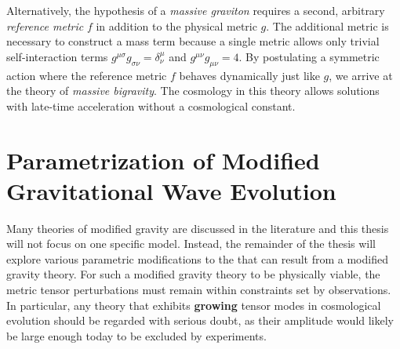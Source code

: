 \documentclass[12pt,parskip=half]{scrreprt}
\begin{document}
Alternatively, the hypothesis of a \emph{massive graviton} requires a second, arbitrary \emph{reference metric} \(f\) in addition to the physical metric \(g\). The additional metric is necessary to construct a mass term because a single metric allows only trivial self-interaction terms \(g^{\mu\sigma}g_{\sigma\nu}=\delta^\mu_\nu\) and \(g^{\mu\nu}g_{\mu\nu} = 4\). By postulating a symmetric action where the reference metric \(f\) behaves dynamically just like \(g\), we arrive at the theory of \emph{massive bigravity}.
The cosmology in this theory allows solutions with late-time acceleration without a cosmological constant. 




\chapter{Parametrization of Modified Gravitational Wave Evolution}\label{ch:param_mod_grav}

Many theories of modified gravity are discussed in the literature  and this thesis will not focus on one specific model. Instead, the remainder of the thesis will explore various parametric modifications to the  that can result from a modified gravity theory. For such a modified gravity theory to be physically viable, the metric tensor perturbations must remain within constraints set by observations. In particular, any theory that exhibits \textbf{growing} tensor modes in cosmological evolution should be regarded with serious doubt, as their amplitude would likely be large enough today to be excluded by experiments.  
\end{document}
